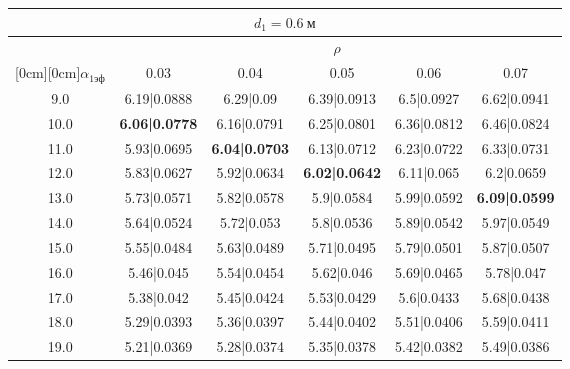 \documentclass[20pt]{article}
\begin{document}
\begin{center}
\begin{tabular}{c|ccccc}
\hline
	\multicolumn{6}{c}{$d_{1}=0.6 \ м$} \\
\hline
	 & \multicolumn{5}{|c}{$\rho$} \\
	\cline{2-6}
	\raisebox{1.5ex}[0cm][0cm]{$\alpha_{1эф}$} & 0.03 & 0.04 & 0.05 & 0.06 & 0.07\\
\hline
	9.0 & 	6.19|0.0888 & 	6.29|0.09 & 	6.39|0.0913 & 	6.5|0.0927 & 	6.62|0.0941\\
	10.0 & 	\textbf{6.06|0.0778} & 	6.16|0.0791 & 	6.25|0.0801 & 	6.36|0.0812 & 	6.46|0.0824\\
	11.0 & 	5.93|0.0695 & 	\textbf{6.04|0.0703} & 	6.13|0.0712 & 	6.23|0.0722 & 	6.33|0.0731\\
	12.0 & 	5.83|0.0627 & 	5.92|0.0634 & 	\textbf{6.02|0.0642} & 	6.11|0.065 & 	6.2|0.0659\\
	13.0 & 	5.73|0.0571 & 	5.82|0.0578 & 	5.9|0.0584 & 	5.99|0.0592 & 	\textbf{6.09|0.0599}\\
	14.0 & 	5.64|0.0524 & 	5.72|0.053 & 	5.8|0.0536 & 	5.89|0.0542 & 	5.97|0.0549\\
	15.0 & 	5.55|0.0484 & 	5.63|0.0489 & 	5.71|0.0495 & 	5.79|0.0501 & 	5.87|0.0507\\
	16.0 & 	5.46|0.045 & 	5.54|0.0454 & 	5.62|0.046 & 	5.69|0.0465 & 	5.78|0.047\\
	17.0 & 	5.38|0.042 & 	5.45|0.0424 & 	5.53|0.0429 & 	5.6|0.0433 & 	5.68|0.0438\\
	18.0 & 	5.29|0.0393 & 	5.36|0.0397 & 	5.44|0.0402 & 	5.51|0.0406 & 	5.59|0.0411\\
	19.0 & 	5.21|0.0369 & 	5.28|0.0374 & 	5.35|0.0378 & 	5.42|0.0382 & 	5.49|0.0386\\
\end{tabular}


\end{center}
\end{document}
